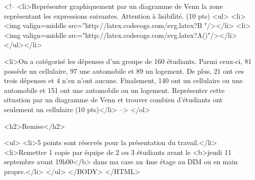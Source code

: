 	
<!--	<li>Représenter graphiquement par un diagramme de Venn la zone représentant les expressions suivantes.  Attention à lisibilité. (10 pts)
	<ul>
		<li><img valign=middle src="http://latex.codecogs.com/svg.latex?\cup B \cap {}"/></li>
		<li><img valign=middle src="http://latex.codecogs.com/svg.latex?A\cap ()"/></li>
	</ul></li>
	
	<li>On a catégorisé les dépenses d’un groupe de 160 étudiants. Parmi ceux-ci, 81 possède un cellulaire, 97 une automobile et 89 un logement. De plus, 21 ont ces trois dépenses et 4 n’en n’ont aucune. Finalement, 140 ont un cellulaire ou une automobile et 151 ont une automobile ou un logement.  Représenter cette situation par un diagramme de Venn et trouver combien d’étudiants ont seulement un cellulaire  (10 pts)</li> -->
</ol>
		

	<h2>Remise</h2>

	<ul>
		<li>5 points sont réservés pour la présentation du travail.</li>		
		<li>Remettre 1 copie par équipe de 2 ou 3 étudiants avant le <b>jeudi 11 septembre avant 19h00</b> dans ma case au 4me étage au DIM ou en main propre.</li>
	</ul>
	</BODY>
</HTML>






